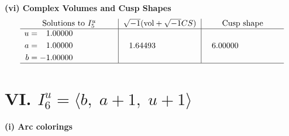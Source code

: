 \documentclass[1p]{elsarticle_modified}
\theoremstyle{definition}
\newcommand{\I}{\sqrt{-1}}
\begin{document}
\newpage\flushleft \textbf{(vi) Complex Volumes and Cusp Shapes}
$$\begin{array}{c|c|c}  
\text{Solutions to }I^u_{5}& \I (\text{vol} + \sqrt{-1}CS) & \text{Cusp shape}\\
 \hline 
\begin{aligned}
u &= \phantom{-}1.00000\phantom{ +0.000000I} \\
a &= \phantom{-}1.00000\phantom{ +0.000000I} \\
b &= -1.00000\phantom{ +0.000000I}\end{aligned}
 & \phantom{-}1.64493\phantom{ +0.000000I} & \phantom{-}6.00000\phantom{ +0.000000I}\\
 \hline 
 \end{array}$$\newpage\newpage\renewcommand{\arraystretch}{1}
\centering \section*{VI. $I^u_{6}= \langle b,\;a+1,\;u+1 \rangle$}
\flushleft \textbf{(i) Arc colorings}\\
\end{document}
